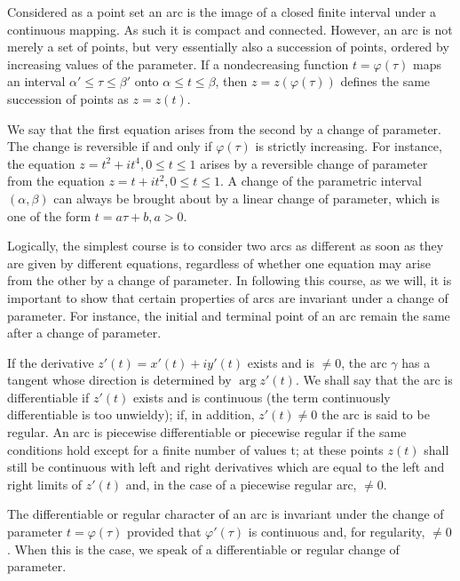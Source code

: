 Considered as a point set an arc is the image of a closed finite interval under a continuous mapping. As such it is compact and connected. However, an arc is not merely a set of points, but very essentially also a succession of points, ordered by increasing values of the parameter. If a nondecreasing function $t = \varphi(\tau)$ maps an interval $\alpha' \leq \tau \leq \beta'$ onto $\alpha \leq t \leq \beta$, then $z = z(\varphi(\tau))$ defines the same succession of points as $z = z(t)$.


We say that the first equation arises from the second by a change of parameter. The change is reversible if and only if $\varphi(\tau)$ is strictly increasing. For instance, the equation $z = t^{2} + it^{4}, 0 \leq t \leq 1$ arises by a reversible change of parameter from the equation $z = t + it^{2}, 0 \leq t \leq 1$. A change of the parametric interval $(\alpha, \beta)$ can always be brought about by a linear change of parameter, which is one of the form $t = a\tau + b, a > 0$.

Logically, the simplest course is to consider two arcs as different as soon as they are given by different equations, regardless of whether one equation may arise from the other by a change of parameter. In following this course, as we will, it is important to show that certain properties of arcs are invariant under a change of parameter. For instance, the initial and terminal point of an arc remain the same after a change of parameter.

If the derivative $z'(t) = x'(t) + iy'(t)$ exists and is $\neq 0$, the arc $\gamma$ has a tangent whose direction is determined by $\arg z'(t)$. We shall say that the arc is differentiable if $z'(t)$ exists and is continuous (the term continuously differentiable is too unwieldy); if, in addition, $z'(t) \neq 0$ the arc is said to be regular. An arc is piecewise differentiable or piecewise regular if the same conditions hold except for a finite number of values t; at these points $z(t)$ shall still be continuous with left and right derivatives which are equal to the left and right limits of $z'(t)$ and, in the case of a piecewise regular arc, $\neq 0$.

The differentiable or regular character of an arc is invariant under the change of parameter $t = \varphi(\tau)$ provided that $\varphi'(\tau)$ is continuous and, for regularity, $\neq0$. When this is the case, we speak of a differentiable or regular change of parameter.

